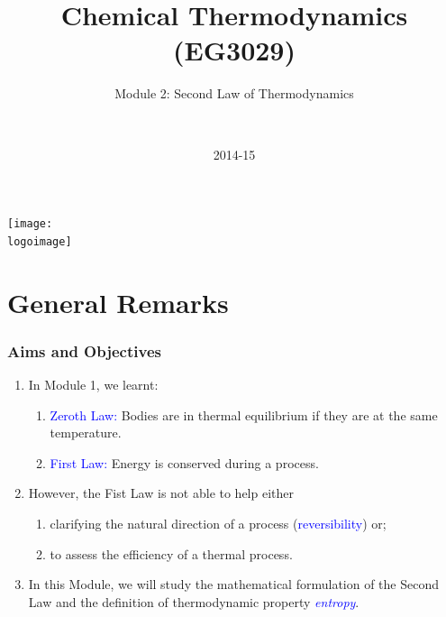 \documentclass[10pt,compress]{beamer}
\institute{School of Engineering}
\title{Chemical Thermodynamics (EG3029)}
\subtitle{Module 2: Second Law of Thermodynamics}
\date[2014-15]{2014-15}
\author[\shortname]{%
  \fullname\\\ttfamily{\emailaddress}
}
\newcommand{\logoimage}{../../FigBanner/UoAHorizBanner}
\begin{document}
\begin{frame}
  \titlepage
  \vfill%
  \begin{center}
    \texttt{[image: \\logoimage]}
  \end{center}
\end{frame}






\section{General Remarks}

\begin{frame}
 \frametitle{Aims and Objectives}
   \begin{enumerate}
     \item<1-> In Module 1, we learnt:
       \begin{enumerate}
         \item<1-> \textcolor{blue}{Zeroth Law:} Bodies are in thermal equilibrium if they are at the same temperature.
         \item<1-> \textcolor{blue}{First Law:} Energy is conserved during a process.
       \end{enumerate} 
     \item<2-> However, the Fist Law is not able to help either 
       \begin{enumerate}
         \item<2-> clarifying the natural direction of a process (\textcolor{blue}{reversibility}) or;
         \item<2-> to assess the efficiency of a thermal process.
       \end{enumerate}
     \item<3-> In this Module, we will study the mathematical formulation of the Second Law and the definition of thermodynamic property \textcolor{blue}{\it entropy}.
   \end{enumerate}

\end{frame}
\end{document}
